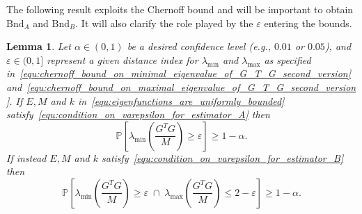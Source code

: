 \documentclass[10pt,twocolumn,twoside]{IEEEtran}					%
\newcounter{generalCounter}
\theoremstyle	{plain}
\newtheorem		{lemma}			[generalCounter]	{Lemma}
\newcommand{\Probability}			[0]	{\mathbb{P}}
\newcommand{\ProbabilityOf}			[1]	{\Probability \left[ #1 \right]}
\begin{document}
The following result exploits the Chernoff bound and will be important to obtain $\mathrm{Bnd}_{A}$ and $\mathrm{Bnd}_{B}$.
It will also clarify the role played by the $\varepsilon$ entering the bounds. 
%
\begin{lemma}
	Let $\alpha \in (0, 1)$ be a desired confidence level (e.g., $0.01$ or $0.05$), and $\varepsilon \in (0, 1]$ represent a given distance index for $\lambda_{\textrm{min}}$ and $\lambda_{\textrm{max}}$ as specified in~\eqref{equ:chernoff_bound_on_minimal_eigenvalue_of_G_T_G_second_version} and~\eqref{equ:chernoff_bound_on_maximal_eigenvalue_of_G_T_G_second_version}. If $E, M$ and $k$ in~\eqref{equ:eigenfunctions_are_uniformly_bounded} satisfy~\eqref{equ:condition_on_varepsilon_for_estimator_A} then
	\begin{equation}
		\ProbabilityOf
		{
			\lambda_{\textrm{min}} \left( \frac{G^{T} G}{M} \right)
			\geq
			\varepsilon 
		}
		\geq
		1 - \alpha .
		\label{equ:chernoff_bound_on_minimal_eigenvalue_of_G_T_G_second_version}
	\end{equation}
	If instead $E, M$ and $k$ satisfy~\eqref{equ:condition_on_varepsilon_for_estimator_B} then
	\begin{equation}
		\ProbabilityOf
		{
			\lambda_{\textrm{min}} \left( \frac{G^{T} G}{M} \right)
			\geq
			\varepsilon 
			\; \cap \;
			\lambda_{\textrm{max}} \left( \frac{G^{T} G}{M} \right)
			\leq
			2 - \varepsilon 
		}
		\geq
		1 - \alpha .
		\label{equ:chernoff_bound_on_maximal_eigenvalue_of_G_T_G_second_version}
	\end{equation}
	\label{thm:chernoff_bound_on_eigenvalues_of_G_T_G}
\end{lemma}
\end{document}
